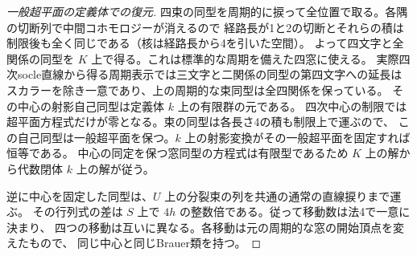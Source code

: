 \begin{proof}[一般超平面の定義体での復元]
四束の同型を周期的に捩って全位置で取る。各隅の切断列で中間コホモロジーが消えるので
経路長が1と2の切断とそれらの積は制限後も全く同じである（核は経路長から4を引いた空間）。
よって四文字と全関係の同型を $K$ 上で得る。これは標準的な周期を備えた四窓に使える。
実際四次socle直線から得る周期表示では三文字と二関係の同型の第四文字への延長は
スカラーを除き一意であり、上の周期的な束同型は全四関係を保っている。
その中心の射影自己同型は定義体 $k$ 上の有限群の元である。
四次中心の制限では超平面方程式だけが零となる。束の同型は各長さ4の積も制限上で運ぶので、
この自己同型は一般超平面を保つ。$k$ 上の射影変換がその一般超平面を固定すれば恒等である。
中心の同定を保つ窓同型の方程式は有限型であるため $K$ 上の解から代数閉体 $k$ 上の解が従う。

逆に中心を固定した同型は、$U$ 上の分裂束の列を共通の通常の直線捩りまで運ぶ。
その行列式の差は $S$ 上で $4h$ の整数倍である。従って移動数は法4で一意に決まり、
四つの移動は互いに異なる。各移動は元の周期的な窓の開始頂点を変えたもので、
同じ中心と同じBrauer類を持つ。
\end{proof}
